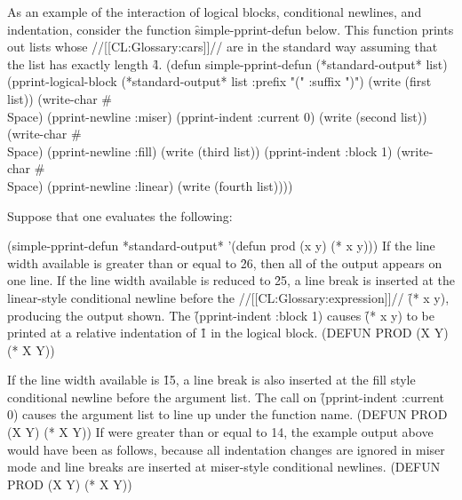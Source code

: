 \endsubsubsection%

\endsubSection%

 

As an example of the interaction of logical blocks, conditional newlines, and indentation, consider the function \f{simple-pprint-defun} below.  This function prints out lists whose //[[CL:Glossary:cars]]// are  in the  standard way assuming that the list has exactly length \f{4}.
  \code (defun simple-pprint-defun (*standard-output* list)
  (pprint-logical-block (*standard-output* list :prefix "(" :suffix ")")
    (write (first list))
    (write-char #\\Space)
    (pprint-newline :miser)
    (pprint-indent :current 0)
    (write (second list))
    (write-char #\\Space)
    (pprint-newline :fill)
    (write (third list))
    (pprint-indent :block 1)
    (write-char #\\Space)
    (pprint-newline :linear)
    (write (fourth list)))) \endcode

Suppose that one evaluates the following:

\code (simple-pprint-defun *standard-output* '(defun prod (x y) (* x y))) \endcode
  If the line width available is greater than or equal to \f{26}, then all of the output appears on one line.  If the line width available is reduced to \f{25}, a line break is inserted at the  linear-style conditional newline before the //[[CL:Glossary:expression]]// \f{(* x y)}, producing the output shown.  The \f{(pprint-indent :block 1)} causes \f{(* x y)} to be printed at a relative indentation of \f{1} in the logical block.
  \code
 (DEFUN PROD (X Y) 
   (* X Y)) \endcode 

If the line width available is \f{15}, a line break is also inserted at the fill style conditional newline before the argument list.  The call on \f{(pprint-indent :current 0)} causes the argument list to line up under the function name.
  \code (DEFUN PROD
       (X Y)
  (* X Y)) \endcode
  If  were greater than or equal to 14, the example  output above would have been as follows, because all indentation changes  are ignored in miser mode and line breaks are inserted at  miser-style conditional newlines.
  \code
 (DEFUN
  PROD
  (X Y)
  (* X Y)) \endcode 

